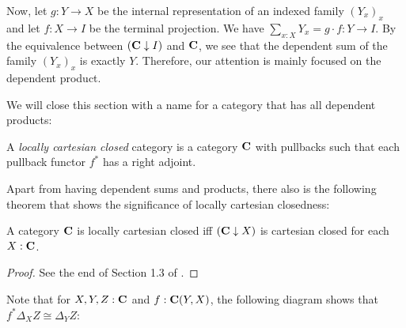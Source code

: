 Now, let $ g : Y \to X $ be the internal representation of an indexed family $ (Y_x)_x $ and let $ f : X \to I $ be the terminal projection. We have $ \sum_{x : X} Y_x = g \cdot f : Y \to I $. By the equivalence between $ (\mathbf{C} \downarrow I) $ and $ \mathbf{C} $, we see that the dependent sum of the family $ (Y_x)_x $ is exactly $ Y $. Therefore, our attention is mainly focused on the dependent product.

We will close this section with a name for a category that has all dependent products:

\begin{definition}
  A \textit{locally cartesian closed} category is a category $ \mathbf{C} $ with pullbacks such that each pullback functor $ f^* $ has a right adjoint.
\end{definition}

Apart from having dependent sums and products, there also is the following theorem that shows the significance of locally cartesian closedness:
\begin{lemma}\label{lem:locally-cartesian-closed}
  A category $ \mathbf{C} $ is locally cartesian closed iff $ (\mathbf{C} \downarrow X) $ is cartesian closed for each $ X : \mathbf{C} $.
\end{lemma}
\begin{proof}
  See the end of Section 1.3 of \autocite{freyd}.
\end{proof}

\begin{remark}\label{rem:pullback-of-projection}
  Note that for $ X, Y, Z : \mathbf{C} $ and $ f: \mathbf{C}(Y, X) $, the following diagram shows that $ f^* \Delta_X Z \cong \Delta_Y Z $:
  \begin{center}
  \end{center}
\end{remark}

